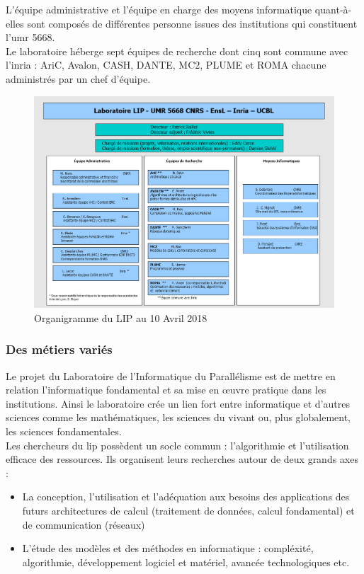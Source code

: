 L'équipe administrative et l'équipe en charge des moyens informatique quant-à-elles sont composés de différentes personne issues des institutions qui constituent l'\gls{umr} 5668.\\

Le laboratoire héberge sept équipes de recherche dont cinq sont commune avec l'\gls{inria} : AriC, Avalon, CASH, DANTE, MC2, PLUME et ROMA chacune administrés par un chef d'équipe.

\begin{figure}[h]
	\center
	\includegraphics[scale=0.5]{partie1/images/organigramme.png}
	\caption{Organigramme du LIP au 10 Avril 2018 \cite{organigramme}}
\end{figure}
\subsubsection{Des métiers variés}
Le projet du Laboratoire de l'Informatique du Parallélisme est de mettre en relation l'informatique fondamental et sa mise en œuvre pratique dans les institutions. Ainsi le laboratoire crée un lien fort entre informatique et d'autres sciences comme les mathématiques, les sciences du vivant ou, plus globalement, les sciences fondamentales.\cite{presUCBL}\\

Les chercheurs du \gls{lip} possèdent un socle commun : l'algorithmie et l'utilisation efficace des ressources. Ils organisent leurs recherches autour de deux grands axes :
\begin{itemize}
	\item La conception, l'utilisation et l'adéquation aux besoins des applications des futurs architectures de calcul (traitement de données, calcul fondamental) et de communication (réseaux)
	\item L'étude des modèles et des méthodes en informatique : compléxité, algorithmie, développement logiciel et matériel, avancée technologiques etc.\\
\end{itemize}

